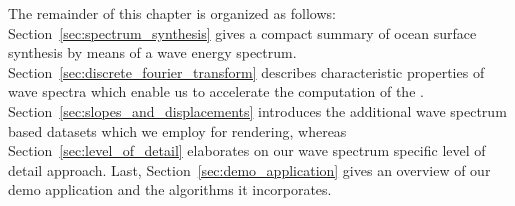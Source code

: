 

%



%
%
%

The remainder of this chapter is organized as follows:
Section~\ref{sec:spectrum_synthesis} gives a compact summary of ocean surface
synthesis by means of a wave energy spectrum.
Section~\ref{sec:discrete_fourier_transform} describes characteristic properties of
wave spectra which enable us to accelerate the computation of the \InvFourierTransform.
Section~\ref{sec:slopes_and_displacements} introduces the additional wave spectrum
based datasets which we employ for rendering, whereas
Section~\ref{sec:level_of_detail} elaborates on our wave spectrum specific
level of detail approach. Last, Section~\ref{sec:demo_application} gives an
overview of our demo application and the algorithms it incorporates.

